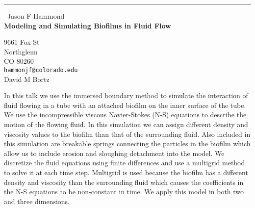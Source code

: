 \documentclass{report}
\begin{document}
\begin{center}
\rule{6in}{1pt} \
{\large Jason F Hammond \\
{\bf Modeling and Simulating Biofilms in Fluid Flow }}

9661 Fox St \\ Northglenn \\ CO 80260
\\
{\tt hammonjf@colorado.edu}\\
David M Bortz\end{center}

In this talk we use the immersed boundary method to simulate the
interaction of fluid flowing in a tube with an attached biofilm on the
inner surface of the tube. We use the incompressible viscous
Navier-Stokes (N-S) equations to describe the motion of the flowing
fluid. In this simulation we can assign different density and viscosity
values to the biofilm than that of the surrounding fluid. Also included
in this simulation are breakable springs connecting the particles in the
biofilm which allow us to include erosion and sloughing detachment into
the model. We discretize the fluid equations using finite differences and
use a multigrid method to solve it at each time step. Multigrid is used
because the biofilm has a different density and viscosity than the
surrounding fluid which causes the coefficients in the N-S equations to
be non-constant in time. We apply this model in both two and three
dimensions.
\end{document}
